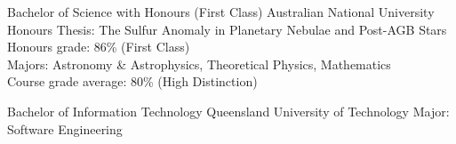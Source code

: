 \documentclass[11pt]{article} %
\begin{document}
{Bachelor of Science with Honours (First Class)}
{}{Australian National University}
{
Honours Thesis: The Sulfur Anomaly in Planetary Nebulae and Post-AGB Stars\\
Honours grade: 86\% (First Class)\\
Majors: Astronomy \& Astrophysics, Theoretical Physics, Mathematics\\
Course grade average: 80\% (High Distinction)
}

{Bachelor of Information Technology}
{}{Queensland University of Technology}
{
Major: Software Engineering
}

\end{document}
